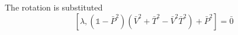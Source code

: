 \begin{multicols}{3}

  The rotation is substituted
  \begin{equation}
    \label{eq:-constraint}
    \left[\lambda, \left(\mathds{1} - \bar{P}^2\right)\left(\bar{V}^2 + \bar{T}^2 - \bar{V}^2\bar{T}^2\right) + \bar{P}^2\right] = \bar{0}
  \end{equation}
  

\end{multicols}
